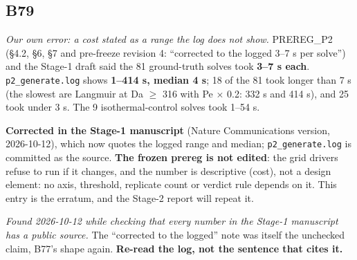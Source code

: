 \documentclass[10pt]{article}
\begin{document}
\subsection*{B79}\label{led:B79}
\begin{description}[leftmargin=0pt,itemsep=1pt]
\item[Defect.] \emph{Our own error: a cost stated as a range the log does not show.} PREREG\_P2 (§4.2, §6, §7 and pre-freeze revision 4: ``corrected to the logged 3--7 s per solve'') and the Stage-1 draft said the 81 ground-truth solves took \textbf{3--7 s each}. \texttt{p2\_generate.log} shows \textbf{1--414 s, median 4 s}; 18 of the 81 took longer than 7 s (the slowest are Langmuir at Da $\geq$ 316 with Pe $\times$ 0.2: 332 s and 414 s), and 25 took under 3 s. The 9 isothermal-control solves took 1--54 s.
\item[Resolution.] \textbf{Corrected in the Stage-1 manuscript} (Nature Communications version, 2026-10-12), which now quotes the logged range and median; \texttt{p2\_generate.log} is committed as the source. \textbf{The frozen prereg is not edited}: the grid drivers refuse to run if it changes, and the number is descriptive (cost), not a design element: no axis, threshold, replicate count or verdict rule depends on it. This entry is the erratum, and the Stage-2 report will repeat it.
\item[Note.] \emph{Found 2026-10-12 while checking that every number in the Stage-1 manuscript has a public source.} The ``corrected to the logged'' note was itself the unchecked claim, B77's shape again. \textbf{Re-read the log, not the sentence that cites it.}
\end{description}
\end{document}
